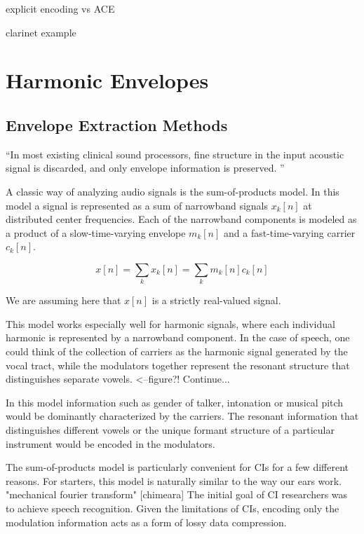 \documentclass [11pt, proquest] {uwthesis}[2015/03/03]
\begin{document}
explicit encoding vs ACE

clarinet example



\chapter{Harmonic Envelopes}


\section{Envelope Extraction Methods}

``In most existing clinical sound processors, fine structure in the input acoustic signal is discarded, and only envelope information is preserved. ''  %


A classic way of analyzing audio signals is the sum-of-products model.  In this model a signal is represented as a sum of narrowband signals $x_k[n]$ at distributed center frequencies.  Each of the narrowband components is modeled as a product of a slow-time-varying envelope $m_k[n]$ and a fast-time-varying carrier $c_k[n]$.


\begin{equation}
\label{eq:sum-of-products}
x[n] = \sum\limits_k x_k[n] = \sum\limits_k m_k[n] c_k[n]
\end{equation}


We are assuming here that $x[n]$ is a strictly real-valued signal.

This model works especially well for harmonic signals, where each individual harmonic is represented by a narrowband component.  In the case of speech, one could think of the collection of carriers as the harmonic signal generated by the vocal tract, while the modulators together represent the resonant structure that distinguishes separate vowels. <--figure?!  Continue...

In this model information such as gender of talker, intonation or musical pitch would be dominantly characterized by the carriers.  The resonant information that distinguishes different vowels or the unique formant structure of a particular instrument would be encoded in the modulators.

The sum-of-products model is particularly convenient for CIs for a few different reasons. For starters, this model is naturally similar to the way our ears work. "mechanical fourier transform" [chimeara] The initial goal of CI researchers was to achieve speech recognition.  Given the limitations of CIs, encoding only the modulation information acts as a form of lossy data compression.
\end{document}
